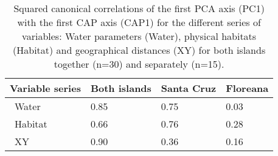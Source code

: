 \renewcommand{\arraystretch}{1.25}
\begin{table}
\centering
\scriptsize
\caption{Squared canonical correlations of the first PCA axis (PC1) with the first CAP axis (CAP1) for the different series of variables: Water parameters (Water), physical habitats (Habitat) and geographical distances (XY) for both islands together (n=30) and separately (n=15).}
\label{can_correl_CAP_Transectlevel_Median}
\begin{tabular}{@{}l|P{2cm}P{2cm}P{2cm}@{}}
\toprule
                                                                      Variable series  & Both islands & Santa Cruz & Floreana  \\ 
\midrule
~Water       & 0.85         & 0.75       & 0.03       \\ 
~Habitat & 0.66         & 0.76       & 0.28       \\
~XY       & 0.90         & 0.36       & 0.16       \\ 
\bottomrule
\end{tabular}
\end{table}
\renewcommand{\arraystretch}{1}
